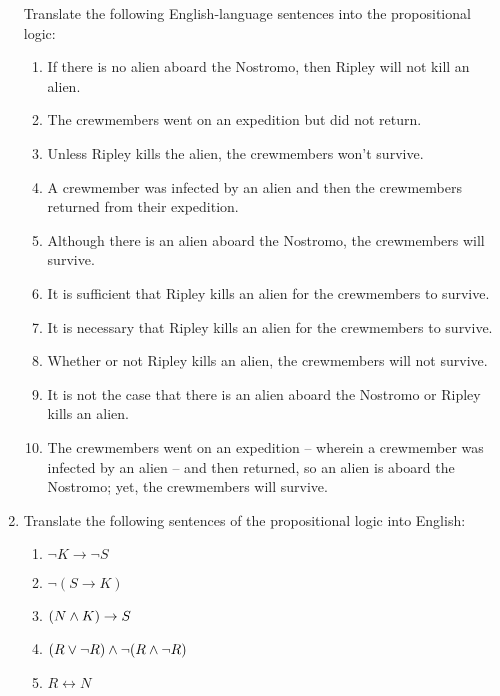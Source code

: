 \begin{enumerate}
        Translate the following English-language sentences into the propositional logic:
        \begin{enumerate}
            \item
                If there is no alien aboard the Nostromo,
                then Ripley will not kill an alien.
            \item
                The crewmembers went on an expedition but did not return.
            \item
                Unless Ripley kills the alien, the crewmembers won't survive.
            \item
                A crewmember was infected by an alien
                and then the crewmembers returned from their expedition.
            \item
                Although there is an alien aboard the Nostromo,
                the crewmembers will survive.
            \item
                It is sufficient that Ripley kills an alien
                for the crewmembers to survive.
            \item
                It is necessary that Ripley kills an alien
                for the crewmembers to survive.
            \item
                Whether or not Ripley kills an alien,
                the crewmembers will not survive.
            \item
                It is not the case that
                there is an alien aboard the Nostromo
                or Ripley kills an alien.
            \item
                The crewmembers went on an expedition
                -- wherein a crewmember was infected by an alien --
                and then returned,
                so an alien is aboard the Nostromo;
                yet, the crewmembers will survive.
        \end{enumerate}

    \item \label{prob:3}
        Translate the following sentences of the propositional logic into English:
        \begin{enumerate}
            \item
                $\neg K \rightarrow \neg S$
            \item
                $\neg (S \rightarrow K)$
            \item
                $(N \wedge K) \rightarrow S$
            \item
                $(R \vee \neg R) \wedge \neg (R \wedge \neg R)$
            \item
                $R \leftrightarrow N$
        \end{enumerate}
\end{enumerate}

